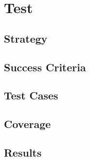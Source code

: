 \chapter{Test}
		\section{Strategy}
		\section{Success Criteria}
		\section{Test Cases}
		\section{Coverage}
		\section{Results}
